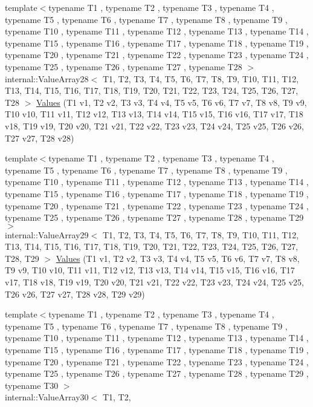 \begin{DoxyCompactItemize}
\item 
{\footnotesize template$<$typename T1 , typename T2 , typename T3 , typename T4 , typename T5 , typename T6 , typename T7 , typename T8 , typename T9 , typename T10 , typename T11 , typename T12 , typename T13 , typename T14 , typename T15 , typename T16 , typename T17 , typename T18 , typename T19 , typename T20 , typename T21 , typename T22 , typename T23 , typename T24 , typename T25 , typename T26 , typename T27 , typename T28 $>$ }\\internal\-::\-Value\-Array28$<$ \-T1, \-T2, \*
\-T3, \-T4, \-T5, \-T6, \-T7, \-T8, \-T9, \*
\-T10, \-T11, \-T12, \-T13, \-T14, \-T15, \*
\-T16, \-T17, \-T18, \-T19, \-T20, \-T21, \*
\-T22, \-T23, \-T24, \-T25, \-T26, \-T27, \*
\-T28 $>$ \hyperlink{namespacetesting_a5785254e0510108d9d422e32ba18f170}{\-Values} (\-T1 v1, \-T2 v2, \-T3 v3, \-T4 v4, \-T5 v5, \-T6 v6, \-T7 v7, \-T8 v8, \-T9 v9, \-T10 v10, \-T11 v11, \-T12 v12, \-T13 v13, \-T14 v14, \-T15 v15, \-T16 v16, \-T17 v17, \-T18 v18, \-T19 v19, \-T20 v20, \-T21 v21, \-T22 v22, \-T23 v23, \-T24 v24, \-T25 v25, \-T26 v26, \-T27 v27, \-T28 v28)
\item 
{\footnotesize template$<$typename T1 , typename T2 , typename T3 , typename T4 , typename T5 , typename T6 , typename T7 , typename T8 , typename T9 , typename T10 , typename T11 , typename T12 , typename T13 , typename T14 , typename T15 , typename T16 , typename T17 , typename T18 , typename T19 , typename T20 , typename T21 , typename T22 , typename T23 , typename T24 , typename T25 , typename T26 , typename T27 , typename T28 , typename T29 $>$ }\\internal\-::\-Value\-Array29$<$ \-T1, \-T2, \*
\-T3, \-T4, \-T5, \-T6, \-T7, \-T8, \-T9, \*
\-T10, \-T11, \-T12, \-T13, \-T14, \-T15, \*
\-T16, \-T17, \-T18, \-T19, \-T20, \-T21, \*
\-T22, \-T23, \-T24, \-T25, \-T26, \-T27, \*
\-T28, \-T29 $>$ \hyperlink{namespacetesting_a3d8a9bd3f027d89ff2873e3f0ff396cb}{\-Values} (\-T1 v1, \-T2 v2, \-T3 v3, \-T4 v4, \-T5 v5, \-T6 v6, \-T7 v7, \-T8 v8, \-T9 v9, \-T10 v10, \-T11 v11, \-T12 v12, \-T13 v13, \-T14 v14, \-T15 v15, \-T16 v16, \-T17 v17, \-T18 v18, \-T19 v19, \-T20 v20, \-T21 v21, \-T22 v22, \-T23 v23, \-T24 v24, \-T25 v25, \-T26 v26, \-T27 v27, \-T28 v28, \-T29 v29)
\item 
{\footnotesize template$<$typename T1 , typename T2 , typename T3 , typename T4 , typename T5 , typename T6 , typename T7 , typename T8 , typename T9 , typename T10 , typename T11 , typename T12 , typename T13 , typename T14 , typename T15 , typename T16 , typename T17 , typename T18 , typename T19 , typename T20 , typename T21 , typename T22 , typename T23 , typename T24 , typename T25 , typename T26 , typename T27 , typename T28 , typename T29 , typename T30 $>$ }\\internal\-::\-Value\-Array30$<$ \-T1, \-T2, \*

\end{DoxyCompactItemize}
